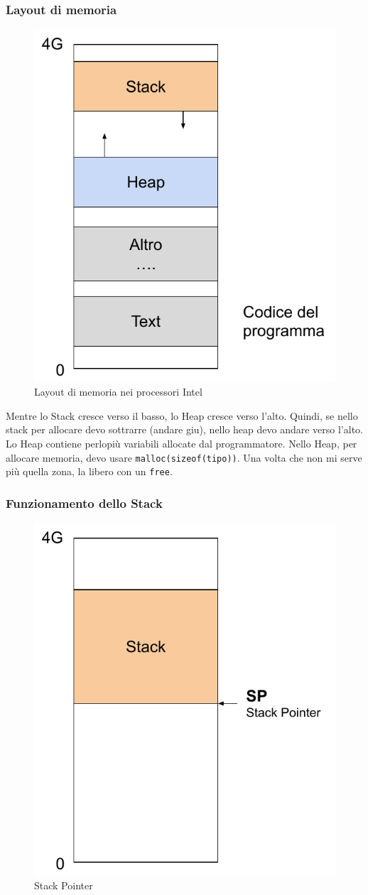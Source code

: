 \documentclass[a4paper,12pt]{article}
\begin{document}
\subsubsection{Layout di memoria}

\begin{figure}[H]
	\centering
	\includegraphics[width=0.5\linewidth]{Immagini/Stack1.pdf}
	\caption{Layout di memoria nei processori Intel}
\end{figure}

Mentre lo Stack cresce verso il basso, lo Heap cresce verso l'alto. Quindi, se nello stack per allocare devo sottrarre (andare giu), nello heap devo andare verso l'alto.\\
Lo Heap contiene perlopiù variabili allocate dal programmatore. Nello Heap, per allocare memoria, devo usare \texttt{malloc(sizeof(tipo))}. Una volta che non mi serve più quella zona, la libero con un \texttt{free}.

\subsubsection{Funzionamento dello Stack}

\begin{figure}[H]
	\centering
	\includegraphics[width=0.5\linewidth]{Immagini/Stack2.pdf}
	\caption{Stack Pointer}
\end{figure}
\end{document}
